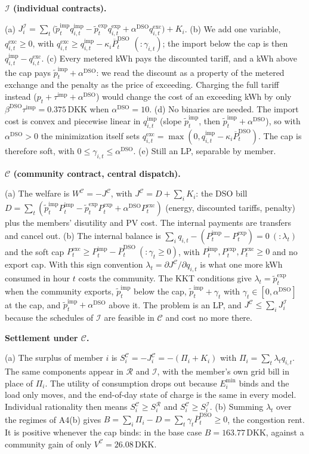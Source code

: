 \documentclass[10pt,a4paper]{article}
\newcommand{\cR}{\mathcal{R}}
\newcommand{\cI}{\mathcal{I}}
\newcommand{\cC}{\mathcal{C}}
\newcommand{\pti}{\tilde p^{\mathrm{imp}}_t}
\newcommand{\pte}{\tilde p^{\mathrm{exp}}_t}
\newcommand{\Pimp}{P^{\mathrm{imp}}_t}
\newcommand{\Pexp}{P^{\mathrm{exp}}_t}
\newcommand{\Pexc}{P^{\mathrm{exc}}_t}
\newcommand{\Pcap}{\overline P^{\mathrm{DSO}}_t}
\newcommand{\aD}{\alpha^{\mathrm{DSO}}}
\newcommand{\bD}{\beta^{\mathrm{DSO}}}
\newcommand{\qitem}[2]{\par\smallskip\noindent{\color{dtured}\textbf{#1}}\enspace\textbf{#2}\par\nopagebreak}
\begin{document}
\qitem{A3}{$\cI$ (individual contracts).}
\begin{answer}
(a) $J^{\cI}_i=\sum_t\big(\pti q^{\mathrm{imp}}_{i,t}-\pte q^{\mathrm{exp}}_{i,t}+\aD q^{\mathrm{exc}}_{i,t}\big)+K_i$.
(b) We add one variable, $q^{\mathrm{exc}}_{i,t}\ge0$, with $q^{\mathrm{exc}}_{i,t}\ge q^{\mathrm{imp}}_{i,t}-\kappa_i\Pcap$ $(:\gamma_{i,t})$; the import below the cap is then $q^{\mathrm{imp}}_{i,t}-q^{\mathrm{exc}}_{i,t}$.
(c) Every metered kWh pays the discounted tariff, and a kWh above the cap pays $\pti+\aD$: we read the discount as a property of the metered exchange and the penalty as the price of exceeding. Charging the full tariff instead ($p_t+\tau^{\mathrm{imp}}+\aD$) would change the cost of an exceeding kWh by only $\bD\tau^{\mathrm{imp}}=0.375$\,DKK when $\aD=10$.
(d) No binaries are needed. The import cost is convex and piecewise linear in $q^{\mathrm{imp}}_{i,t}$ (slope $\pti$, then $\pti+\aD$), so with $\aD>0$ the minimization itself sets $q^{\mathrm{exc}}_{i,t}=\max(0,q^{\mathrm{imp}}_{i,t}-\kappa_i\Pcap)$. The cap is therefore soft, with $0\le\gamma_{i,t}\le\aD$.
(e) Still an LP, separable by member.
\end{answer}

\qitem{A4}{$\cC$ (community contract, central dispatch).}
\begin{answer}
(a) The welfare is $W^{\cC}=-J^{\cC}$, with $J^{\cC}=D+\sum_iK_i$: the DSO bill $D=\sum_t(\pti\Pimp-\pte\Pexp+\aD\Pexc)$ (energy, discounted tariffs, penalty) plus the members' disutility and PV cost. The internal payments are transfers and cancel out.
(b) The internal balance is $\sum_i q_{i,t}-(\Pimp-\Pexp)=0\ (:\lambda_t)$ and the soft cap $\Pexc\ge\Pimp-\Pcap\ (:\gamma_t\ge0)$, with $\Pimp,\Pexp,\Pexc\ge0$ and no export cap. With this sign convention $\lambda_t=\partial J^{\cC}/\partial q_{i,t}$ is what one more kWh consumed in hour $t$ costs the community. The KKT conditions give $\lambda_t=\pte$ when the community exports, $\pti$ below the cap, $\pti+\gamma_t$ with $\gamma_t\in[0,\aD]$ at the cap, and $\pti+\aD$ above it. The problem is an LP, and $J^{\cC}\le\sum_iJ^{\cI}_i$ because the schedules of $\cI$ are feasible in $\cC$ and cost no more there.
\end{answer}

\qitem{A5}{Settlement under $\cC$.}
\begin{answer}
(a) The surplus of member $i$ is $S^{\cC}_i=-J^{\cC}_i=-(\Pi_i+K_i)$ with $\Pi_i=\sum_t\lambda_tq_{i,t}$. The same components appear in $\cR$ and $\cI$, with the member's own grid bill in place of $\Pi_i$. The utility of consumption drops out because $E^{\min}_i$ binds and the load only moves, and the end-of-day state of charge is the same in every model. Individual rationality then means $S^{\cC}_i\ge S^{\cR}_i$ and $S^{\cC}_i\ge S^{\cI}_i$.
(b) Summing $\lambda_t$ over the regimes of A4(b) gives $B=\sum_i\Pi_i-D=\sum_t\gamma_t\Pcap\ge0$, the congestion rent. It is positive whenever the cap binds: in the base case $B=163.77$\,DKK, against a community gain of only $V^{\cC}=26.08$\,DKK.
\end{answer}
\end{document}
